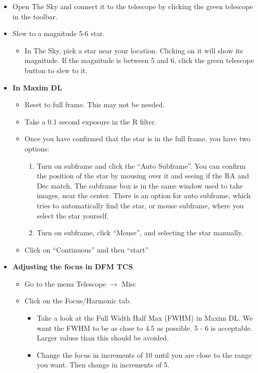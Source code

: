 \documentclass[letterpaper, 12pt]{report}
\begin{document}
\begin{itemize}
	\item Open The Sky and connect it to the telescope by clicking the green telescope in the toolbar.
	\item Slew to a magnitude 5-6 star.
	\begin{itemize}
		\item In The Sky, pick a star near your location. Clicking on it will show its magnitude. If the magnitude is between 5 and 6, click the green telescope button to slew to it.
	\end{itemize}
	\item \large \textbf{In Maxim DL}
	\begin{itemize}
		\item Reset to full frame. This may not be needed.
		\item Take a 0.1 second exposure in the R filter.
	\end{itemize}
	\begin{itemize}
		\item Once you have confirmed that the star is in the full frame, you have two options:
		\begin{enumerate}
			\item Turn on subframe and click the ``Auto Subframe''. You can confirm the position of the star by mousing over it and seeing if the RA and Dec match. The subframe box is in the same window used to take images, near the center. There is an option for auto subframe, which tries to automatically find the star, or mouse subframe, where you select the star yourself.
			\item Turn on subframe, click ``Mouse'', and selecting the star manually.
		\end{enumerate}
		\item Click on ``Continuous'' and then ``start''
	\end{itemize}
	\item \large \textbf{Adjusting the focus in DFM TCS}
	\begin{itemize}
		\item Go to the menu Telescope $\rightarrow$ Misc
		\item Click on the Focus/Harmonic tab.
		\begin{itemize}
			\item Take a look at the Full Width Half Max (FWHM) in Maxim DL. We want the FWHM to be as close to 4.5 as possible. 5 - 6 is acceptable. Larger values than this should be avoided.
			\item Change the focus in increments of 10 until you are close to the range you want. Then change in increments of 5.

\end{itemize}
\end{itemize}
\end{itemize}
\end{document}
